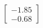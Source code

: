 \documentclass[preview]{standalone}
\begin{document}
\begin{align*}
\begin{bmatrix} -1.85 \\ -0.68 \end{bmatrix}
\end{align*}
\end{document}
